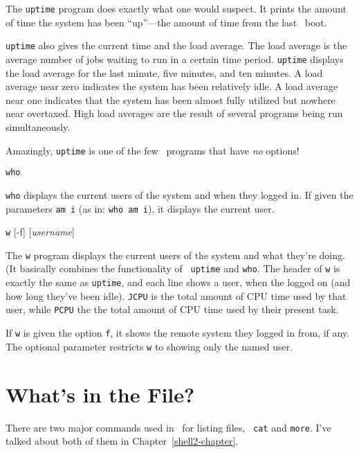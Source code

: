 The {\tt uptime} program does exactly what one would suspect. It
prints the amount of time the system has been ``up''---the amount of
time from the last \unix\ boot. 

{\tt uptime} also gives the current time and the load
average. The load average is the average number of
jobs waiting to run in a certain time period. {\tt uptime} displays
the load average for the last minute, five minutes, and ten minutes.
A load average near zero indicates the system has been relatively
idle. A load average near one indicates that the system has been
almost fully utilized but nowhere near overtaxed. High load averages
are the result of several programs being run simultaneously.

Amazingly, {\tt uptime} is one of the few \unix\ programs that have
{\em no\/} options!

\begin{command}
  {\tt who}
\end{command}

{\tt who} displays the current users of the system and when they
logged in. If given the parameters {\tt am i} (as in: {\tt who am i}),
it displays the current user.

\begin{command}
  {\tt w} [-f] [{\sl username}]
\end{command}

The {\tt w} program displays the current users of the system and what
they're doing. (It basically combines the functionality of {\tt
  uptime} and {\tt who}. The header of
{\tt w} is exactly the same as {\tt uptime}, and each line shows a
user, when the logged on (and how long they've been idle). {\tt JCPU}
is the total amount of CPU time used by that user, while {\tt PCPU}
the the total amount of CPU time used by their present task.

If {\tt w} is given the option {\tt f}, it shows the remote system
they logged in from, if any. The optional parameter restricts {\tt w}
to showing only the named user.

\section{What's in the File?}

There are two major commands used in \unix\ for listing files, {\tt
  cat} and {\tt more}. I've talked about both of them in
Chapter~\ref{shell2-chapter}.

